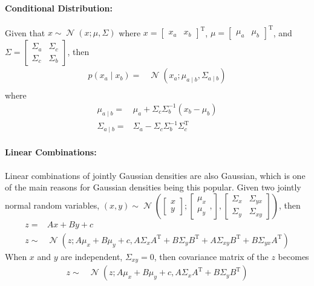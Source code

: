 \documentclass[twoside]{article}
\newcommand{\N}{\operatorname{\mathcal{N}}}
\renewcommand{\t}{^\mathrm{T}{}}
\begin{document}
\paragraph{Conditional Distribution:}
Given that $x\sim\N(x;\mu,\Sigma)$ where
$x = \left[\begin{array}{cc}
	x_a & x_b
\end{array} \right]\t$, $
\mu = \left[\begin{array}{cc}
	\mu_a & \mu_b
\end{array} \right]\t $, and $
\Sigma = \left[\begin{array}{cc}
	\Sigma_a & \Sigma_c\\
	\Sigma_c & \Sigma_b
\end{array} \right] $, then
\begin{align*}
	p(x_a\mid x_b) =& \N(x_a;\mu_{a\mid b},\Sigma_{a\mid b})\\
\end{align*}
where
\begin{align*}
	\mu_{a \mid b} =& \mu_a + \Sigma_c \Sigma_b^{-1}(x_b-\mu_b)\\
	\Sigma_{a \mid b} =& \Sigma_a - \Sigma_c\Sigma_b^{-1}\Sigma_c\t 
\end{align*}
\paragraph{Linear Combinations:}
Linear combinations of jointly Gaussian densities are also Gaussian, which is one of the main reasons for Gaussian densities being this popular. Given two jointly normal random variables, $(x,y)\sim\N\left( \left[ \begin{array}{c}
	x\\y
\end{array}\right] ;\left[ \begin{array}{c}
\mu_x\\\mu_y
\end{array},\right],\left[ \begin{array}{cc}
\Sigma_x & \Sigma_{yx}\\ \Sigma_{y} & \Sigma_{xy}
\end{array}\right]\right)   $, then 
\begin{align*}
	z =& Ax+By+c \\
	z \sim& \N(z;A\mu_x+B\mu_y+c,A\Sigma_xA\t+B\Sigma_yB\t+A\Sigma_{xy}B\t+B\Sigma_{yx}A\t)
\end{align*}
When $x$ and $y$ are independent, $\Sigma_{xy}=0$, then covariance matrix of the $z$ becomes
\begin{align*}
	z \sim& \N(z;A\mu_x+B\mu_y+c,A\Sigma_xA\t+B\Sigma_yB\t)
\end{align*}
\end{document}
